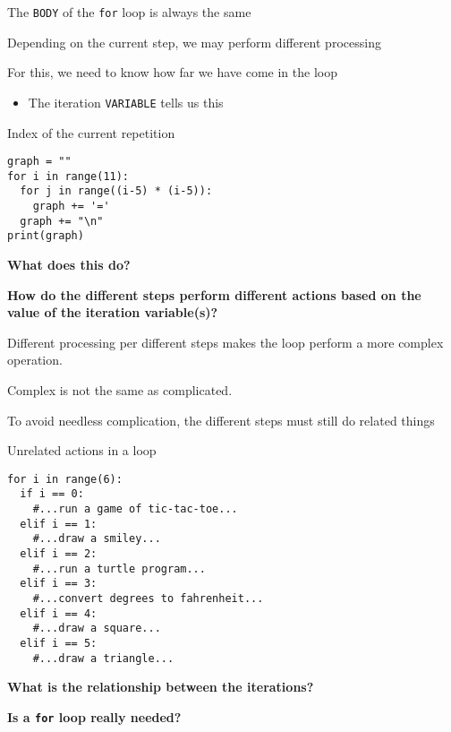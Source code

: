 \documentclass{beamer}
\begin{document}
\begin{slide}{
\item The \texttt{BODY} of the \texttt{for} loop is always the same
\item Depending on the current step, we may perform different processing
\item For this, we need to know how far we have come in the loop
\begin{itemize}
\item The iteration \texttt{VARIABLE} tells us this
\end{itemize}
}\end{slide}

\begin{frame}[fragile]{Index of the current repetition}
\begin{lstlisting}
graph = ""
for i in range(11):
  for j in range((i-5) * (i-5)):
    graph += '='
  graph += "\n"
print(graph)
\end{lstlisting}

\textbf{What does this do?}

\textbf{How do the different steps perform different actions based on the value of the iteration variable(s)?}
\end{frame}

\begin{slide}{
\item Different processing per different steps makes the loop perform a more complex operation.
\item Complex is not the same as complicated.
\item To avoid needless complication, the different steps must still do related things
}\end{slide}

\begin{frame}[fragile]{Unrelated actions in a loop}
\begin{lstlisting}
for i in range(6):
  if i == 0:
    #...run a game of tic-tac-toe...
  elif i == 1:
    #...draw a smiley...
  elif i == 2:
    #...run a turtle program...
  elif i == 3:
    #...convert degrees to fahrenheit...
  elif i == 4:
    #...draw a square...
  elif i == 5:
    #...draw a triangle...
\end{lstlisting}

\textbf{What is the relationship between the iterations?}

\textbf{Is a \texttt{for} loop really needed?}
\end{frame}
\end{document}
